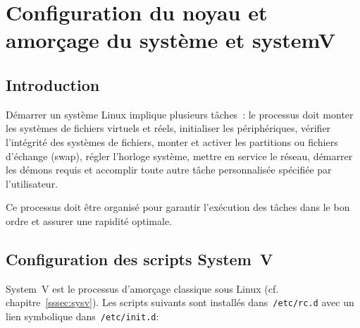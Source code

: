 
\chapter{ Configuration du noyau et amorçage du système et systemV}
\minitoc
\clearpage

\label{sec:kernel-boot}
\section{Introduction}
Démarrer un système Linux implique plusieurs tâches :  
le processus doit monter les systèmes de fichiers virtuels et réels, initialiser les périphériques, vérifier l’intégrité des systèmes de fichiers, monter et activer les partitions ou fichiers d’échange (swap), régler l’horloge système, mettre en service le réseau, démarrer les démons requis et accomplir toute autre tâche personnalisée spécifiée par l’utilisateur.  

\medskip  
Ce processus doit être organisé pour garantir l’exécution des tâches dans le bon ordre et assurer une rapidité optimale.

\section{Configuration des scripts System V}
\label{sssec:sysv-scripts}

System V est le processus d’amorçage classique sous Linux (cf. chapitre \textcolor{blue}{\ref{sssec:sysv}}). Les scripts suivants sont installés dans \texttt{/etc/rc.d} avec un lien symbolique dans \texttt{/etc/init.d}:



